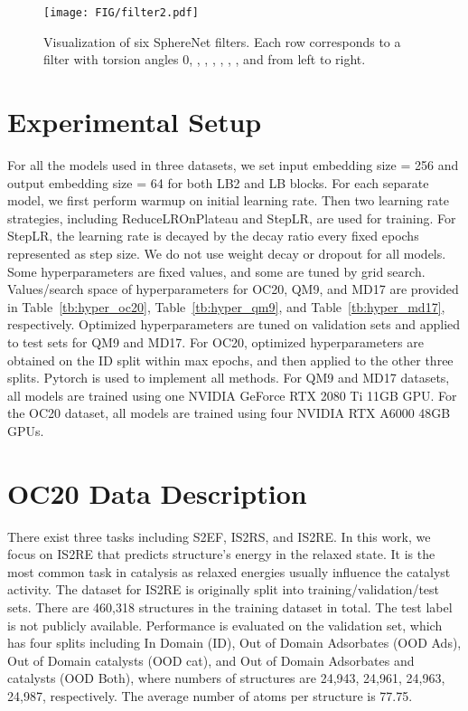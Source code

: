 \documentclass{article}
\begin{document}
\begin{figure}[b]
    \centering
    \texttt{[image: FIG/filter2.pdf]}
    \vspace{-6pt}
    \caption{Visualization of six SphereNet filters.
    Each row corresponds to a filter with torsion angles
    0, , , , , , ,
    and  from left to right.
    }\label{fig:filter2}
    \vspace{-10 pt}
\end{figure}

\section{Experimental Setup} \label{sec:supp_D}
For all the models used in three datasets,
we set input embedding size = 256
and output embedding size = 64 for both LB2 and LB blocks.
For each separate model, we first perform warmup on initial learning rate.
Then two learning rate strategies, including ReduceLROnPlateau and StepLR, are used for training. For StepLR, the learning rate is decayed by the decay ratio every fixed epochs represented as step size.
We do not use weight decay or dropout for all models.
Some hyperparameters are fixed values, and 
some are tuned by grid search.
Values/search space of hyperparameters for OC20, QM9, and MD17 are provided in
Table~\ref{tb:hyper_oc20}, Table~\ref{tb:hyper_qm9},
and Table~\ref{tb:hyper_md17}, respectively.
Optimized hyperparameters are tuned on validation sets
and applied to test sets for QM9 and MD17.
For OC20, optimized hyperparameters are obtained on the ID split within max epochs, and then applied to the other three splits.
Pytorch is used to implement all methods.
For QM9 and MD17 datasets, all models are trained using
one NVIDIA GeForce RTX 2080 Ti 11GB GPU.
For the OC20 dataset, all models are trained using
four NVIDIA RTX A6000 48GB GPUs.

\section{OC20 Data Description} \label{sec:oc20_intro}
There exist three tasks including
S2EF, IS2RS,
and IS2RE.
In this work, we focus on IS2RE that
predicts structure's energy in the relaxed state.
It is the most common task in catalysis as relaxed
energies usually influence the catalyst activity.
The dataset for IS2RE is originally split into 
training/validation/test sets.
There are 460,318 structures in the training dataset in total.
The test label is not publicly available.
Performance is evaluated on the validation set,
which has four splits
including In Domain (ID), Out of Domain Adsorbates (OOD Ads),
Out of Domain catalysts (OOD cat), and Out of Domain Adsorbates and catalysts (OOD Both), where numbers of structures are 24,943,
24,961, 24,963, 24,987, respectively.
The average number of atoms per structure is 77.75.
\end{document}
